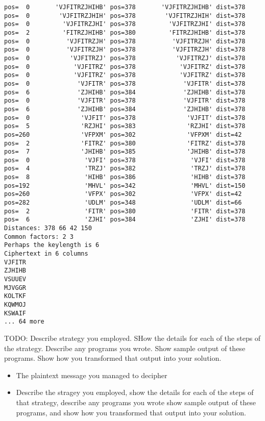 \documentclass[a4paper,english,12pt]{article}
\begin{document}
\begin{verbatim}
pos=  0       'VJFITRZJHIHB' pos=378       'VJFITRZJHIHB' dist=378
pos=  0        'VJFITRZJHIH' pos=378        'VJFITRZJHIH' dist=378
pos=  0         'VJFITRZJHI' pos=378         'VJFITRZJHI' dist=378
pos=  2         'FITRZJHIHB' pos=380         'FITRZJHIHB' dist=378
pos=  0          'VJFITRZJH' pos=378          'VJFITRZJH' dist=378
pos=  0          'VJFITRZJH' pos=378          'VJFITRZJH' dist=378
pos=  0           'VJFITRZJ' pos=378           'VJFITRZJ' dist=378
pos=  0            'VJFITRZ' pos=378            'VJFITRZ' dist=378
pos=  0            'VJFITRZ' pos=378            'VJFITRZ' dist=378
pos=  0             'VJFITR' pos=378             'VJFITR' dist=378
pos=  6             'ZJHIHB' pos=384             'ZJHIHB' dist=378
pos=  0             'VJFITR' pos=378             'VJFITR' dist=378
pos=  6             'ZJHIHB' pos=384             'ZJHIHB' dist=378
pos=  0              'VJFIT' pos=378              'VJFIT' dist=378
pos=  5              'RZJHI' pos=383              'RZJHI' dist=378
pos=260              'VFPXM' pos=302              'VFPXM' dist=42
pos=  2              'FITRZ' pos=380              'FITRZ' dist=378
pos=  7              'JHIHB' pos=385              'JHIHB' dist=378
pos=  0               'VJFI' pos=378               'VJFI' dist=378
pos=  4               'TRZJ' pos=382               'TRZJ' dist=378
pos=  8               'HIHB' pos=386               'HIHB' dist=378
pos=192               'MHVL' pos=342               'MHVL' dist=150
pos=260               'VFPX' pos=302               'VFPX' dist=42
pos=282               'UDLM' pos=348               'UDLM' dist=66
pos=  2               'FITR' pos=380               'FITR' dist=378
pos=  6               'ZJHI' pos=384               'ZJHI' dist=378
Distances: 378 66 42 150
Common factors: 2 3
Perhaps the keylength is 6
Ciphertext in 6 columns
VJFITR
ZJHIHB
VSUUEV
MJVGGR
KOLTKF
KQWMOJ
KSWAIF
... 64 more
\end{verbatim}

TODO: Describe strategy you employed. SHow the details for each of the steps of
the strategy. Describe any programs you wrote. Show sample output of these
programs. Show how you transformed that output into your solution.

\begin{itemize}
  \item The plaintext message you managed to decipher
  \item Describe the stragey you employed, show the details for each of the
    steps of that strategy, describe any programs you wrote show sample output
    of these programs, and show how you transformed that output into your
    solution.
\end{itemize}
\end{document}
